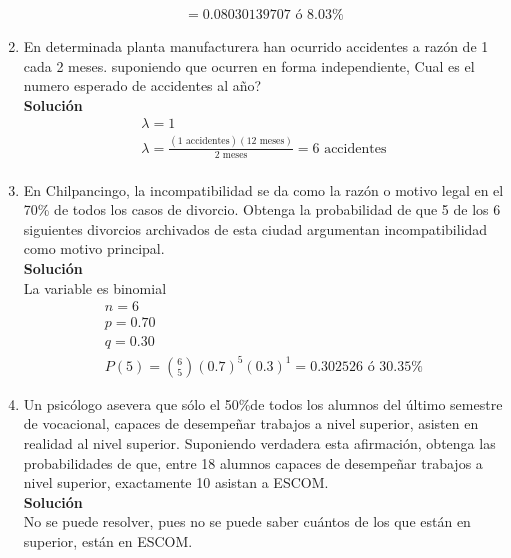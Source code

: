 \begin{enumerate}
\begin{gather*}
    = 0.08030139707 \text{ ó } 8.03\%
    \end{gather*}
    \item En determinada planta manufacturera han ocurrido accidentes a razón de 1 cada 2 meses. suponiendo que ocurren en forma independiente, Cual es el numero esperado de accidentes al año?
    \\\textbf{Solución}
    \\
    \begin{gather*}
    \lambda = 1 \tag{ cada 2 meses}\\
    \lambda = \frac{(1 \text{ accidentes})(12 \text{ meses})}{2 \text{ meses}} = 6 \text{ accidentes}\\
    \end{gather*}
    \item En Chilpancingo, la incompatibilidad se da como la razón o motivo legal en el 70\% de todos los casos de divorcio. Obtenga la probabilidad de que 5 de los 6 siguientes divorcios archivados de esta ciudad argumentan incompatibilidad como motivo principal.
    \\\textbf{Solución}
    \\La variable es binomial
    \begin{gather*}    
    n = 6\\
    p = 0.70 \\
    q = 0.30 \\
    P(5) = \binom{6}{5}(0.7)^5(0.3)^1 = 0.302526 \text{ ó }  30.35\%
    \end{gather*}
    \item Un psicólogo asevera que sólo el 50\%de todos los alumnos del último semestre de vocacional, capaces de desempeñar trabajos a nivel superior, asisten en realidad al nivel superior. Suponiendo verdadera esta afirmación, obtenga las probabilidades de que, entre 18 alumnos capaces de desempeñar trabajos a nivel superior, exactamente 10 asistan a ESCOM.
    \\\textbf{Solución}
    \\ No se puede resolver, pues no se puede saber cuántos de los que están en superior, están en ESCOM.
\end{enumerate}